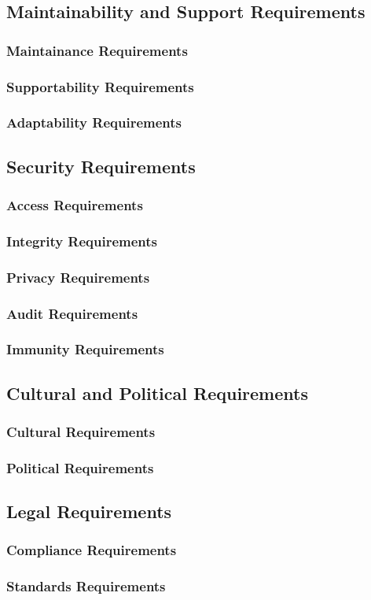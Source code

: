 \documentclass[12pt, titlepage]{article}
\begin{document}
  \subsection{Maintainability and Support Requirements}

    \subsubsection{Maintainance Requirements}
    \subsubsection{Supportability Requirements}
    \subsubsection{Adaptability Requirements}

  \subsection{Security Requirements}

    \subsubsection{Access Requirements}
    \subsubsection{Integrity Requirements}
    \subsubsection{Privacy Requirements}
    \subsubsection{Audit Requirements}
    \subsubsection{Immunity Requirements}

  \subsection{Cultural and Political Requirements}

    \subsubsection{Cultural Requirements}
    \subsubsection{Political Requirements}

  \subsection{Legal Requirements}

    \subsubsection{Compliance Requirements}
    \subsubsection{Standards Requirements}
\end{document}
